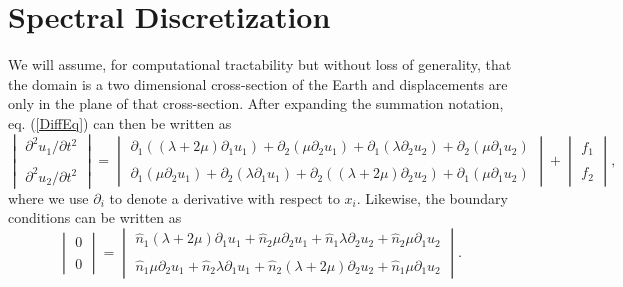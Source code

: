 \documentclass[12pt]{article}
\begin{document}
\section*{Spectral Discretization}
We will assume, for computational tractability but without loss of
generality, that the domain is a two dimensional cross-section of the
Earth and displacements are only in the plane of that cross-section.
After expanding the summation notation, eq. (\ref{DiffEq}) can then be
written as
\begin{equation}
\begin{vmatrix}
  \partial^2 u_1/\partial t^2\\ \\
  \partial^2 u_2/\partial t^2
\end{vmatrix} =
\begin{vmatrix}
 \partial_1\left((\lambda + 2\mu)\partial_1 u_1\right) +  
 \partial_2\left(\mu\partial_2 u_1\right) + 
 \partial_1\left(\lambda\partial_2 u_2\right) +  
 \partial_2\left(\mu\partial_1 u_2\right)\\ \\
 \partial_1\left(\mu\partial_2 u_1\right) +  
 \partial_2\left(\lambda\partial_1 u_1\right) + 
 \partial_2\left((\lambda + 2\mu)\partial_2 u_2\right) +  
 \partial_1\left(\mu\partial_1 u_2\right) 
\end{vmatrix} + 
\begin{vmatrix}
  f_1\\ \\
  f_2
\end{vmatrix},
\end{equation}
where we use $\partial_i$ to denote a derivative with respect to
$x_i$.  Likewise, the boundary conditions can be written as
\begin{equation}
\begin{vmatrix}
  0\\ \\
  0
\end{vmatrix} =
\begin{vmatrix}
 \hat{n}_1(\lambda + 2\mu)\partial_1 u_1 +  
 \hat{n}_2\mu\partial_2 u_1 + 
 \hat{n}_1\lambda\partial_2 u_2 +  
 \hat{n}_2\mu\partial_1 u_2\\ \\
 \hat{n}_1\mu\partial_2 u_1 +  
 \hat{n}_2\lambda\partial_1 u_1 + 
 \hat{n}_2(\lambda + 2\mu)\partial_2 u_2 +  
 \hat{n}_1\mu\partial_1 u_2
\end{vmatrix}. 
\end{equation}
\end{document}
